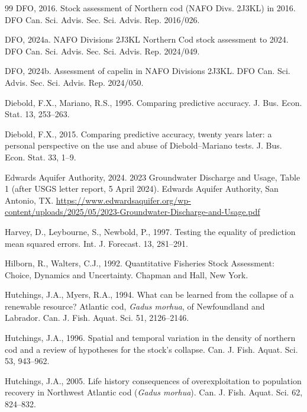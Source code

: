 \begin{thebibliography}{99}
DFO, 2016. Stock assessment of Northern cod (NAFO Divs. 2J3KL) in 2016. DFO Can. Sci. Advis. Sec. Sci. Advis. Rep. 2016/026.

DFO, 2024a. NAFO Divisions 2J3KL Northern Cod stock assessment to 2024. DFO Can. Sci. Advis. Sec. Sci. Advis. Rep. 2024/049.

DFO, 2024b. Assessment of capelin in NAFO Divisions 2J3KL. DFO Can. Sci. Advis. Sec. Sci. Advis. Rep. 2024/050.

Diebold, F.X., Mariano, R.S., 1995. Comparing predictive accuracy. J. Bus. Econ. Stat. 13, 253--263.

Diebold, F.X., 2015. Comparing predictive accuracy, twenty years later: a personal perspective on the use and abuse of Diebold--Mariano tests. J. Bus. Econ. Stat. 33, 1--9.

Edwards Aquifer Authority, 2024. 2023 Groundwater Discharge and Usage, Table 1 (after USGS letter report, 5 April 2024). Edwards Aquifer Authority, San Antonio, TX. \url{https://www.edwardsaquifer.org/wp-content/uploads/2025/05/2023-Groundwater-Discharge-and-Usage.pdf}

Harvey, D., Leybourne, S., Newbold, P., 1997. Testing the equality of prediction mean squared errors. Int. J. Forecast. 13, 281--291.

Hilborn, R., Walters, C.J., 1992. Quantitative Fisheries Stock Assessment: Choice, Dynamics and Uncertainty. Chapman and Hall, New York.

Hutchings, J.A., Myers, R.A., 1994. What can be learned from the collapse of a renewable resource? Atlantic cod, \emph{Gadus morhua}, of Newfoundland and Labrador. Can. J. Fish. Aquat. Sci. 51, 2126--2146.

Hutchings, J.A., 1996. Spatial and temporal variation in the density of northern cod and a review of hypotheses for the stock's collapse. Can. J. Fish. Aquat. Sci. 53, 943--962.

Hutchings, J.A., 2005. Life history consequences of overexploitation to population recovery in Northwest Atlantic cod (\emph{Gadus morhua}). Can. J. Fish. Aquat. Sci. 62, 824--832.


\end{thebibliography}
